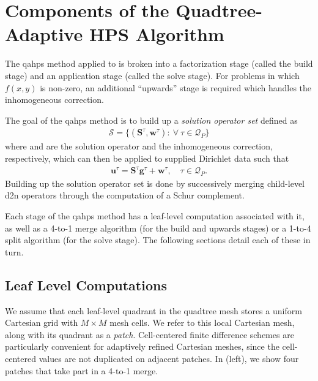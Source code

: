 \section{Components of the Quadtree-Adaptive HPS Algorithm}
\label{sec:quadtree}

The \gls{qahps} method applied to  is broken into a factorization stage (called the build stage) and an application stage (called the solve stage). For problems in which $f(x,y)$ is non-zero, an additional ``upwards'' stage is required which handles the inhomogeneous correction.

The goal of the \gls{qahps} method is to build up a {\em solution operator set} defined as
\begin{align}
    \mathcal{S} = \{(\textbf{S}^{\tau}, \textbf{w}^{\tau}) : \ \forall\ \tau \in \mathcal{Q}_P\}
    \label{eq:solution-operator-set}
\end{align}
where \Stau and \wtau are the solution operator and the inhomogeneous correction, respectively, which can then be applied to supplied Dirichlet data \gtau such that
\begin{align}
    \textbf{u}^{\tau} = \textbf{S}^{\tau} \textbf{g}^{\tau} + \textbf{w}^{\tau},\quad \tau \in \mathcal{Q}_P.
    \label{eq:u-Sg-w}
\end{align}
Building up the solution operator set is done by successively merging child-level \gls{d2n} operators \Ttau through the computation of a Schur complement.

Each stage of the \gls{qahps} method has a leaf-level computation associated with it, as well as a 4-to-1 merge algorithm (for the build and upwards stages) or a 1-to-4 split algorithm (for the solve stage). The following sections detail each of these in turn.

\subsection{Leaf Level Computations}
\label{sub:leaf_level_computations}

We assume that each leaf-level quadrant in the quadtree mesh stores a uniform Cartesian grid with $M \times M$ mesh cells. We refer to this local Cartesian mesh, along with its quadrant as a {\em patch}. Cell-centered finite difference schemes are particularly convenient for adaptively refined Cartesian meshes, since the cell-centered values are not duplicated on adjacent patches. In  (left), we show four patches that take part in a 4-to-1 merge.

